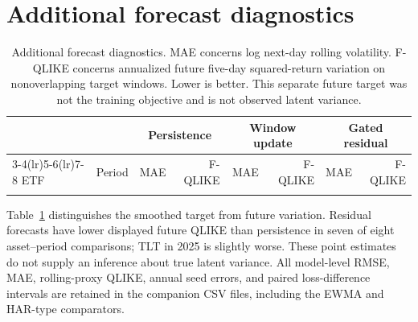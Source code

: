 \section{Additional forecast diagnostics}
\label{app:forecast}
\begin{table}[t]
\centering\small\setlength{\tabcolsep}{5pt}
\caption{Additional forecast diagnostics. MAE concerns log next-day rolling volatility. F-QLIKE concerns annualized future five-day squared-return variation on nonoverlapping target windows. Lower is better. This separate future target was not the training objective and is not observed latent variance.}
\label{tab:additional_forecast}
\begin{tabular}{llrrrrrr}\toprule
& &\multicolumn{2}{c}{Persistence}&\multicolumn{2}{c}{Window update}&\multicolumn{2}{c}{Gated residual}\\
\cmidrule(lr){3-4}\cmidrule(lr){5-6}\cmidrule(lr){7-8}
ETF&Period&MAE&F-QLIKE&MAE&F-QLIKE&MAE&F-QLIKE\\\midrule
\\\bottomrule
\end{tabular}
\end{table}
Table~\ref{tab:additional_forecast} distinguishes the smoothed target from future variation. Residual forecasts have lower displayed future QLIKE than persistence in seven of eight asset--period comparisons; TLT in 2025 is slightly worse. These point estimates do not supply an inference about true latent variance. All model-level RMSE, MAE, rolling-proxy QLIKE, annual seed errors, and paired loss-difference intervals are retained in the companion CSV files, including the EWMA and HAR-type comparators.

